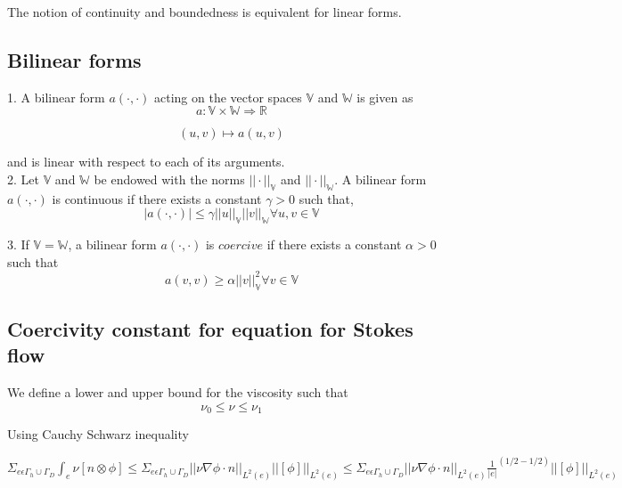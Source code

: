 \documentclass[a4paper,12pt]{book}
\begin{document}
The notion of continuity and boundedness is equivalent for linear forms.

\subsection{Bilinear forms}

1. A bilinear form $a(\cdot,\cdot)$ acting on the vector spaces $\mathbb{V}$ and $\mathbb{W}$ is given as\\
\begin{equation}
a : \mathbb{V} \times \mathbb{W} \Rightarrow \mathbb{R}
\end{equation}

\begin{equation}
(u,v) \mapsto a(u,v)
\end{equation}

and is linear with respect to each of its arguments.\\

2. Let $\mathbb{V}$ and $\mathbb{W}$ be endowed with the norms $||\cdot||_\mathbb{V}$ and $||\cdot||_\mathbb{W}$. A bilinear form $a(\cdot,\cdot)$ is continuous if there exists a constant $\gamma > 0$ such that,\\
\begin{equation}
|a(\cdot,\cdot)| \leq \gamma ||u||_\mathbb{V} ||v||_\mathbb{W} \forall u,v \in \mathbb{V}
\end{equation}

3. If $\mathbb{V} = \mathbb{W}$, a bilinear form $a(\cdot,\cdot)$ is $coercive$ if there exists a constant $\alpha > 0$ such that \\
\begin{equation}
a(v,v) \geq \alpha ||v||_\mathbb{V}^2 \forall v \in \mathbb{V}
\end{equation}

\subsection{Coercivity constant for equation for Stokes flow} \label{basics}

We define a lower and upper bound for the viscosity such that \\
\begin{equation}
\nu_0 \leq \nu \leq \nu_1
\end{equation}

Using Cauchy Schwarz inequality

$\Sigma_{e \epsilon \Gamma_h \cup \Gamma_D} \int_e {\nu}[n\otimes \phi] \leq \Sigma_{e \epsilon \Gamma_h \cup \Gamma_D} ||\nu \nabla \phi \cdot n||_{L^2(e)} ||[\phi]||_{L^2(e)} \leq \Sigma_{e \epsilon \Gamma_h \cup \Gamma_D} ||\nu \nabla \phi \cdot n||_{L^2(e)} {\frac{1}{|e|}}^{(1/2-1/2)} ||[\phi]||_{L^2(e)}$
\end{document}
